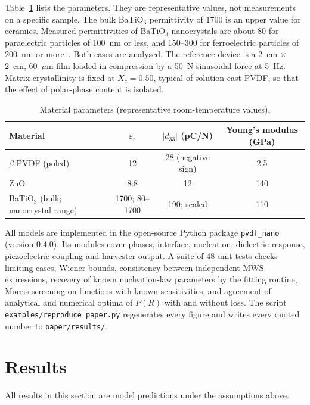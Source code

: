 \documentclass[11pt,a4paper]{article}
\newcommand{\BTO}{BaTiO$_3$}
\newcommand{\dt}{d_{33}}
\begin{document}
Table~\ref{tab:params} lists the parameters. They are representative values, not measurements on a specific sample. The bulk \BTO{} permittivity of 1700 is an upper value for ceramics. Measured permittivities of \BTO{} nanocrystals are about 80 for paraelectric particles of 100~nm or less, and 150--300 for ferroelectric particles of 200~nm or more~\cite{Li2024}. Both cases are analysed. The reference device is a 2~cm $\times$ 2~cm, 60~$\mu$m film loaded in compression by a 50~N sinusoidal force at 5~Hz. Matrix crystallinity is fixed at $X_c=0.50$, typical of solution-cast PVDF, so that the effect of polar-phase content is isolated.

\begin{table}[htbp]
\centering
\caption{Material parameters (representative room-temperature values).}
\label{tab:params}
\small
\begin{tabular}{lccc}
\toprule
Material & $\varepsilon_r$ & $|\dt|$ (pC/N) & Young's modulus (GPa) \\
\midrule
$\beta$-PVDF (poled) & 12 & 28 (negative sign) & 2.5 \\
ZnO & 8.8 & 12 & 140 \\
\BTO{} (bulk; nanocrystal range) & 1700; 80--1700 & 190; scaled & 110 \\
\bottomrule
\end{tabular}
\end{table}

All models are implemented in the open-source Python package \texttt{pvdf\_nano} (version 0.4.0). Its modules cover phases, interface, nucleation, dielectric response, piezoelectric coupling and harvester output. A suite of 48 unit tests checks limiting cases, Wiener bounds, consistency between independent MWS expressions, recovery of known nucleation-law parameters by the fitting routine, Morris screening on functions with known sensitivities, and agreement of analytical and numerical optima of $P(R)$ with and without loss. The script \texttt{examples/reproduce\_paper.py} regenerates every figure and writes every quoted number to \texttt{paper/results/}.

\section{Results}
All results in this section are model predictions under the assumptions above.
\end{document}
